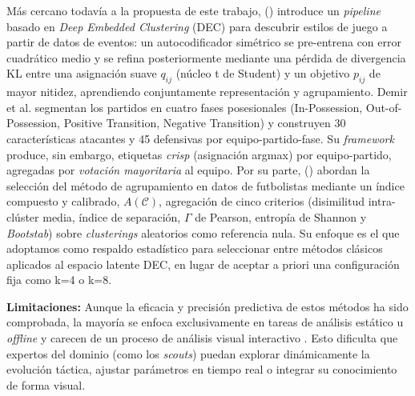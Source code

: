 \documentclass[conference]{IEEEtran}
\begin{document}
Más cercano todavía a la propuesta de este trabajo, \citeauthor{demir2026how} (\citeyear{demir2026how}) introduce un \textit{pipeline} basado en \textit{Deep Embedded Clustering} (DEC) para descubrir estilos de juego a partir de datos de eventos: un autocodificador simétrico se pre-entrena con error cuadrático medio y se refina posteriormente mediante una pérdida de divergencia KL entre una asignación suave $q_{ij}$ (núcleo t de Student) y un objetivo $p_{ij}$ de mayor nitidez, aprendiendo conjuntamente representación y agrupamiento. Demir et al. segmentan los partidos en cuatro fases posesionales (In-Possession, Out-of-Possession, Positive Transition, Negative Transition) y construyen 30 características atacantes y 45 defensivas por equipo-partido-fase. Su \textit{framework} produce, sin embargo, etiquetas \textit{crisp} (asignación argmax) por equipo-partido, agregadas por \textit{votación mayoritaria} al equipo. Por su parte, \citeauthor{akhanli2022clustering} (\citeyear{akhanli2022clustering}) abordan la selección del método de agrupamiento en datos de futbolistas mediante un índice compuesto y calibrado, $A(\mathcal{C})$, agregación de cinco criterios (disimilitud intra-clúster media, índice de separación, $\Gamma$ de Pearson, entropía de Shannon y \textit{Bootstab}) sobre \textit{clusterings} aleatorios como referencia nula. Su enfoque es el que adoptamos como respaldo estadístico para seleccionar entre métodos clásicos aplicados al espacio latente DEC, en lugar de aceptar a priori una configuración fija como k=4 o k=8.

\textbf{Limitaciones:} Aunque la eficacia y precisión predictiva de estos métodos ha sido comprobada, la mayoría se enfoca exclusivamente en tareas de análisis estático u \textit{offline} y carecen de un proceso de análisis visual interactivo \citep{hvattum2019comprehensive, anzer2021goal, pacifico2025fuzzy}. Esto dificulta que expertos del dominio (como los \textit{scouts}) puedan explorar dinámicamente la evolución táctica, ajustar parámetros en tiempo real o integrar su conocimiento de forma visual.
\end{document}
